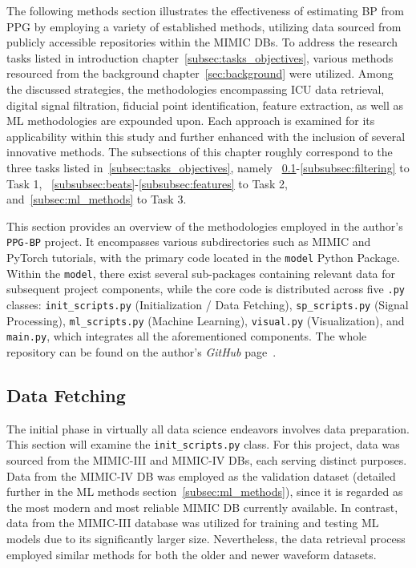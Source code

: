The following methods section illustrates the effectiveness of estimating BP from PPG by employing a variety of established methods, utilizing data sourced from publicly accessible repositories within the MIMIC DBs.
To address the research tasks listed in introduction chapter~\ref{subsec:tasks_objectives}, various methods resourced from the background chapter~\ref{sec:background} were utilized.
Among the discussed strategies, the methodologies encompassing ICU data retrieval, digital signal filtration, fiducial point identification, feature extraction, as well as ML methodologies are expounded upon.
Each approach is examined for its applicability within this study and further enhanced with the inclusion of several innovative methods.
The subsections of this chapter roughly correspond to the three tasks listed in~\ref{subsec:tasks_objectives},
namely ~\ref{subsec:data-fetching}-\ref{subsubsec:filtering} to Task 1,
~\ref{subsubsec:beats}-\ref{subsubsec:features} to Task 2,
and~\ref{subsec:ml_methods} to Task 3.

This section provides an overview of the methodologies employed in the author's \texttt{PPG-BP} project.
It encompasses various subdirectories such as MIMIC and PyTorch tutorials, with the primary code located in the \texttt{model} Python Package.
Within the \texttt{model}, there exist several sub-packages containing relevant data for subsequent project components,
while the core code is distributed across five \texttt{.py} classes: \texttt{init\_scripts.py} (Initialization / Data Fetching), \texttt{sp\_scripts.py} (Signal Processing),
\texttt{ml\_scripts.py} (Machine Learning), \texttt{visual.py} (Visualization), and \texttt{main.py}, which integrates all the aforementioned components.
The whole repository can be found on the author's \textit{GitHub} page~\cite{jasinskasHtjasPPGBPProject2024}.

\subsection{Data Fetching}
\label{subsec:data-fetching}

The initial phase in virtually all data science endeavors involves data preparation.
This section will examine the \texttt{init\_scripts.py} class.
For this project, data was sourced from the MIMIC-III and MIMIC-IV DBs, each serving distinct purposes.
Data from the MIMIC-IV DB was employed as the validation dataset (detailed further in the ML methods section~\ref{subsec:ml_methods}), since it is regarded as the most modern and most reliable MIMIC DB currently available.
In contrast, data from the MIMIC-III database was utilized for training and testing ML models due to its significantly larger size.
Nevertheless, the data retrieval process employed similar methods for both the older and newer waveform datasets.

